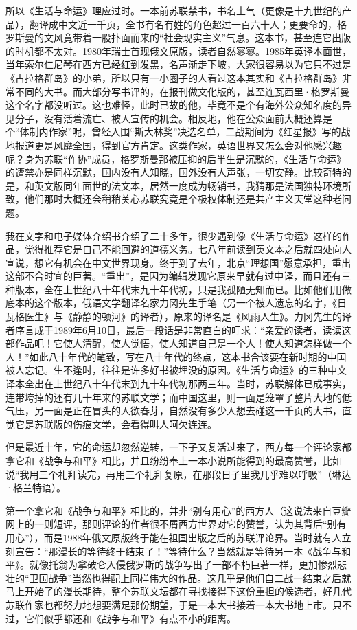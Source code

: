 所以《生活与命运》理应过时。一本前苏联禁书，书名土气（更像是十九世纪的产品），翻译成中文近一千页，全书有名有姓的角色超过一百六十人；更要命的，格罗斯曼的文风竟带着一股扑面而来的“社会现实主义”气息。这本书，甚至连它出版的时机都不太对。1980年瑞士首现俄文原版，读者自然寥寥。1985年英译本面世，当年索尔仁尼琴在西方已经红到发黑，名声渐走下坡，大家很容易以为它只不过是《古拉格群岛》的小弟，所以只有一小圈子的人看过这本其实和《古拉格群岛》非常不同的大书。而大部分写书评的，在报刊做文化版的，甚至连瓦西里·格罗斯曼这个名字都没听过。这也难怪，此时已故的他，毕竟不是个有海外公众知名度的异见分子，没有活着流亡、被人宣传的机会。相反地，他在公众面前大概还算是个“体制内作家”呢，曾经入围“斯大林奖”决选名单，二战期间为《红星报》写的战地报道更是风靡全国，得到官方肯定。这类作家，英语世界又怎么会对他感兴趣呢？身为苏联“作协”成员，格罗斯曼那被压抑的后半生是沉默的，《生活与命运》的遭禁亦是同样沉默，国内没有人知晓，国外没有人声张，一切安静。比较奇特的是，和英文版同年面世的法文本，居然一度成为畅销书，我猜那是法国独特环境所致，他们那时大概还会稍稍关心苏联究竟是个极权体制还是共产主义天堂这种老问题。

我在文字和电子媒体介绍书介绍了二十多年，很少遇到像《生活与命运》这样的作品，觉得推荐它是自己不能回避的道德义务。七八年前读到英文本之后就四处向人宣说，想它有机会在中文世界现身。终于到了去年，北京“理想国”愿意承担，重出这部不合时宜的巨著。“重出”，是因为编辑发现它原来早就有过中译，而且还有三种版本，全在上世纪八十年代末九十年代初，只是我孤陋无知而已。比如他们用做底本的这个版本，俄语文学翻译名家力冈先生手笔（另一个被人遗忘的名字，《日瓦格医生》与《静静的顿河》的译者），原来的译名是《风雨人生》。力冈先生的译者序言成于1989年6月10日，最后一段话是非常直白的吁求：“亲爱的读者，读读这部作品吧！它使人清醒，使人觉悟，使人知道自己是一个人！使人知道怎样做一个人！”如此八十年代的笔致，写在八十年代的终点，这本书合该要在新时期的中国被人忘记。生不逢时，往往是许多好书被埋没的原因。《生活与命运》的三种中文译本全出在上世纪八十年代末到九十年代初那两三年。当时，苏联解体已成事实，连带垮掉的还有几十年来的苏联文学；而中国这里，则一面是笼罩了整片大地的低气压，另一面是正在冒头的人欲春芽，自然没有多少人想去碰这一千页的大书，直觉它是苏联版的伤痕文学，会看得叫人呵欠连连。

但是最近十年，它的命运却忽然逆转，一下子又复活过来了，西方每一个评论家都拿它和《战争与和平》相比，并且纷纷奉上一本小说所能得到的最高赞誉，比如说“我用三个礼拜读完，再用三个礼拜复原，在那段日子里我几乎难以呼吸”（琳达·格兰特语）。

第一个拿它和《战争与和平》相比的，并非“别有用心”的西方人（这说法来自豆瓣网上的一则短评，那则评论的作者很不屑西方世界对它的赞誉，认为其背后“别有用心”），而是1988年俄文原版终于能在祖国出版之后的苏联评论界。当时就有人立刻宣告：“那漫长的等待终于结束了！”等待什么？当然就是等待另一本《战争与和平》。就像托翁为拿破仑入侵俄罗斯的战争写出了一部不朽巨著一样，更加惨烈悲壮的“卫国战争”当然也得配上同样伟大的作品。这几乎是他们自二战一结束之后就马上开始了的漫长期待，整个苏联文坛都在寻找接得下这份重担的候选者，好几代苏联作家也都努力地想要满足那份期望，于是一本大书接着一本大书地上市。只不过，它们似乎都还和《战争与和平》有点不小的距离。

